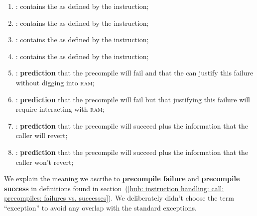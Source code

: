 \begin{enumerate}[resume]
	\item \scenPrcCdo:
		contains the \CDO{} as defined by the  instruction;
	\item \scenPrcCds:
		contains the \CDS{} as defined by the  instruction;
	\item \scenPrcRao:
		contains the \RAO{} as defined by the  instruction;
	\item \scenPrcRac:
		contains the \RAC{} as defined by the  instruction;
	\item \scenPrcFailureKnownToHub:
		\textbf{prediction} that the precompile will fail and that the \hubMod{} can justify this failure without digging into \textsc{ram}; 
	\item \scenPrcFailureKnownToRam:
		\textbf{prediction} that the precompile will fail but that justifying this failure will require interacting with \textsc{ram};
	\item \scenPrcSuccessWillRevert:
		\textbf{prediction} that the precompile will succeed plus the information that the caller will revert;
	\item \scenPrcSuccessWontRevert:
		\textbf{prediction} that the precompile will succeed plus the information that the caller won't revert;
\end{enumerate}
\saNote{} We explain the meaning we ascribe to \textbf{precompile failure} and \textbf{precompile success} in definitions found in section~(\ref{hub: instruction handling: call: precompiles: failures vs. successes}).
We deliberately didn't choose the term ``exception'' to avoid any overlap with the standard \evm{} exceptions. 
